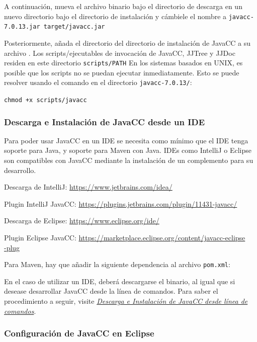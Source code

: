 A continuación, mueva el archivo binario bajo el directorio de descarga en un nuevo directorio bajo el directorio de instalación y cámbiele el nombre a \lstinline|javacc-7.0.13.jar target/javacc.jar|


Posteriormente, añada el directorio del directorio de instalación de JavaCC a su archivo . Los scripts/ejecutables de invocación de JavaCC, JJTree y JJDoc residen en este directorio \lstinline|scripts/PATH|
En los sistemas basados en UNIX, es posible que los scripts no se puedan ejecutar inmediatamente. Esto se puede resolver usando el comando en el directorio \lstinline|javacc-7.0.13/|:

\lstinline|chmod +x scripts/javacc|

\subsubsection{Descarga e Instalación de JavaCC desde un IDE}

Para poder usar JavaCC en un IDE se necesita como mínimo que el IDE tenga soporte para Java, y soporte para Maven con Java. IDEs como IntelliJ o Eclipse son compatibles con JavaCC mediante la instalación de un complemento para su desarrollo.

 Descarga de IntelliJ: \href{https://www.jetbrains.com/idea/}{https://www.jetbrains.com/idea/}
 
 Plugin IntelliJ JavaCC: \href{https://plugins.jetbrains.com/plugin/11431-javacc/}{https://plugins.jetbrains.com/plugin/11431-javacc/}
 
 Descarga de Eclipse: \href{https://www.eclipse.org/ide/}{https://www.eclipse.org/ide/}
 
 Plugin Eclipse JavaCC: \href{https://marketplace.eclipse.org/content/javacc-eclipse-plug}{https://marketplace.eclipse.org/content/javacc-eclipse\\-plug}

Para Maven, hay que añadir la siguiente dependencia al archivo \lstinline|pom.xml|:


\lstset{inputencoding=utf8/latin1}


En el caso de utilizar un IDE, deberá descargarse el binario, al igual que si desease desarrollar JavaCC desde la línea de comandos. Para saber el procedimiento a seguir, visite \href{sec:descargaeinstalaciondejavaccdesdelineadecomandos}{\textit{Descarga e Instalación de JavaCC desde línea de comandos}}.

\subsubsection{Configuración de JavaCC en Eclipse}

